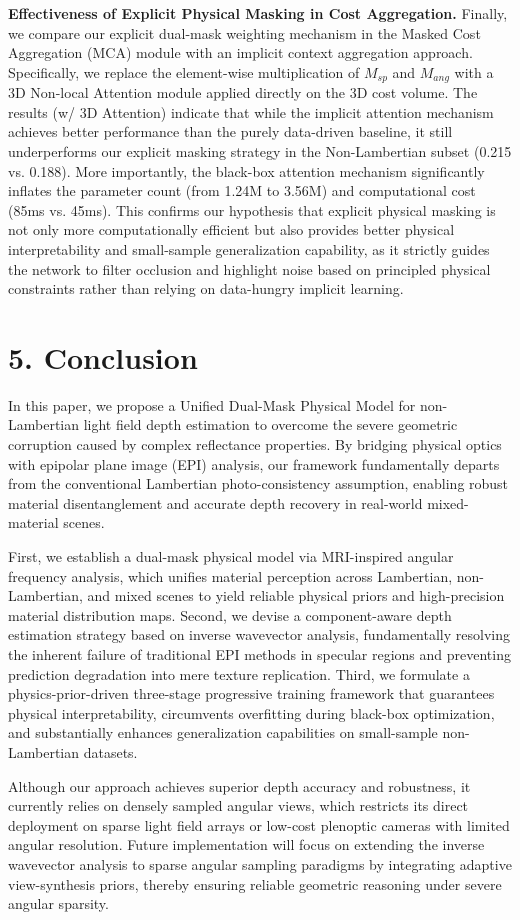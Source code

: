 \documentclass[lettersize,journal]{IEEEtran}
\begin{document}
\textbf{Effectiveness of Explicit Physical Masking in Cost Aggregation.} 
Finally, we compare our explicit dual-mask weighting mechanism in the Masked Cost Aggregation (MCA) module with an implicit context aggregation approach. Specifically, we replace the element-wise multiplication of $M_{sp}$ and $M_{ang}$ with a 3D Non-local Attention module applied directly on the 3D cost volume. The results (w/ 3D Attention) indicate that while the implicit attention mechanism achieves better performance than the purely data-driven baseline, it still underperforms our explicit masking strategy in the Non-Lambertian subset (0.215 vs. 0.188). More importantly, the black-box attention mechanism significantly inflates the parameter count (from 1.24M to 3.56M) and computational cost (85ms vs. 45ms). This confirms our hypothesis that explicit physical masking is not only more computationally efficient but also provides better physical interpretability and small-sample generalization capability, as it strictly guides the network to filter occlusion and highlight noise based on principled physical constraints rather than relying on data-hungry implicit learning.


\section{5. Conclusion}


In this paper, we propose a Unified Dual-Mask Physical Model for non-Lambertian light field depth estimation to overcome the severe geometric corruption caused by complex reflectance properties. By bridging physical optics with epipolar plane image (EPI) analysis, our framework fundamentally departs from the conventional Lambertian photo-consistency assumption, enabling robust material disentanglement and accurate depth recovery in real-world mixed-material scenes. 

First, we establish a dual-mask physical model via MRI-inspired angular frequency analysis, which unifies material perception across Lambertian, non-Lambertian, and mixed scenes to yield reliable physical priors and high-precision material distribution maps. Second, we devise a component-aware depth estimation strategy based on inverse wavevector analysis, fundamentally resolving the inherent failure of traditional EPI methods in specular regions and preventing prediction degradation into mere texture replication. Third, we formulate a physics-prior-driven three-stage progressive training framework that guarantees physical interpretability, circumvents overfitting during black-box optimization, and substantially enhances generalization capabilities on small-sample non-Lambertian datasets. 

Although our approach achieves superior depth accuracy and robustness, it currently relies on densely sampled angular views, which restricts its direct deployment on sparse light field arrays or low-cost plenoptic cameras with limited angular resolution. Future implementation will focus on extending the inverse wavevector analysis to sparse angular sampling paradigms by integrating adaptive view-synthesis priors, thereby ensuring reliable geometric reasoning under severe angular sparsity.




\end{document}

